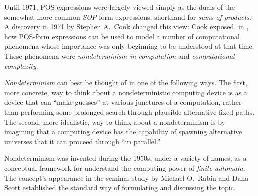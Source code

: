 {

Until 1971, POS expressions were largely viewed simply as the duals of the somewhat more common {\it SOP}-form expressions, shorthand for {\it sums of products}.   A discovery in 1971 by Stephen A.~Cook changed this view: Cook exposed, in \cite{Cook71}, how POS-form expressions can be used to model a number of computational phenomena whose importance
was only beginning to be understood at that time.  These phenomena were {\it nondeterminism in computation} and {\it computational complexity}.

\medskip

{\it Nondeterminism} can best be thought of in one of the following ways.  The first, more concrete, way to think about a nondeterministic computing device is as a device that can ``make guesses'' at various junctures of a computation, rather than performing some prolonged search through plausible alternative fixed paths.  The second, more idealistic, way to think about a nondeterminism is by imagining that a computing device has the capability of spawning alternative universes that it can proceed through ``in parallel.''

\bigskip

\noindent {}
\bigskip

   
 
\noindent 
Nondeterminism was invented during the 1950s, under a variety of names, as a conceptual framework for understand the computing power of {\it finite automata}.  The concept's
appearance in the seminal study \cite{RabinS59} by Michael O.~Rabin and Dana Scott
established the standard way of formulating and discussing the topic.

\medskip

}
